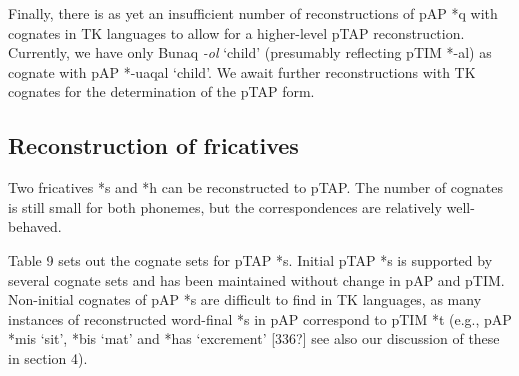 Finally, there is as yet an insufficient number of reconstructions of pAP *q with cognates in TK languages to allow for a higher-level pTAP reconstruction. Currently, we have only Bunaq \textit{{}-ol} `child' (presumably reflecting pTIM *-al) as cognate with pAP *-uaqal `child'. We await further reconstructions with TK cognates for the determination of the pTAP form.

\subsection{Reconstruction of fricatives}
Two fricatives *s and *h can be reconstructed to pTAP. The number of cognates is still small for both phonemes, but the correspondences are relatively well-behaved.

Table 9 sets out the cognate sets for pTAP *s. Initial pTAP *s is supported by several cognate sets and has been maintained without change in pAP and pTIM. Non-initial cognates of pAP *s are difficult to find in TK languages, as many instances of reconstructed word-final *s in pAP correspond to pTIM *t (e.g., pAP *mis `sit', *bis `mat' and *has `excrement'  [336?]  see also our discussion of these in section 4).



